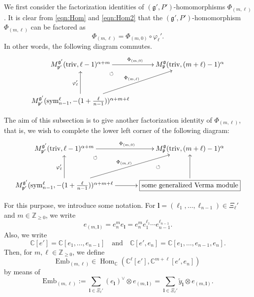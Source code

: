\documentclass[reqno,11pt]{amsart}
\theoremstyle{remark}
\theoremstyle{definition}
\numberwithin{equation}{section}
\newcommand{\ga}{\alpha}
\newcommand{\fg}{{\mathfrak g}}
\newcommand{\fp}{{\mathfrak p}}
\newcommand{\C}{\mathbb{C}}
\newcommand{\Z}{\mathbb{Z}}
\newcommand{\Hom}{\operatorname{Hom}}
\newcommand{\triv}{\mathrm{triv}}
\newcommand{\sym}{\mathrm{sym}}
\newcommand{\Mp}{M^{\fg}_{\fp}}
\newcommand{\Mpp}{M^{\fg'}_{\fp'}}
\newcommand{\Emb}{\mathrm{Emb}}
\newcommand{\wy}{\widetilde{y}}
\begin{document}
We first consider the factorization identities of 
$(\fg',P')$-homomorphisms $\Phi_{(m,\ell)}$.
It is clear from \eqref{eqn:Hom} and \eqref{eqn:Hom2} that
the $(\fg',P')$-homomorphism $\Phi_{(m,\ell)}$ can be factored as
\begin{equation*}
\Phi_{(m,\ell)} = \Phi_{(m,0)}\circ \varphi_\ell'.
\end{equation*}
In other words, the following diagram commutes.
\begin{equation*}
 \xymatrix@=13pt{
 \Mpp(\triv,\ell-1)^{\ga+m} 
 \ar@{}[rd]|{\circlearrowleft}
 \ar[rr]^{\Phi_{(m,0)}}
 && \Mp(\triv,(m+\ell)-1)^\ga\\
 &&\\
 \Mpp(\sym^\ell_{n-1},-(1+\tfrac{\ell}{n-1}))^{\ga+m+\ell}
\ar[uu]^{\varphi_{\ell}'}
 \ar[rruu]^{\Phi_{(m,\ell)}} 
}
\end{equation*}

The aim of this subsection is to give another factorization identity of 
$\Phi_{(m,\ell)}$, that is, we wish to complete the lower left corner
of the following diagram:
\begin{equation*}
 \xymatrix@=13pt{
 \Mpp(\triv,\ell-1)^{\ga+m} 
 \ar@{}[rd]|{\circlearrowleft}
 \ar[rr]^{\Phi_{(m,0)}}
 && \Mp(\triv,(m+\ell)-1)^\ga\\
 &&\\
 \Mpp(\sym^\ell_{n-1},-(1+\tfrac{\ell}{n-1}))^{\ga+m+\ell}
\ar[uu]^{\varphi_{\ell}'}
 \ar[rr] \ar[rruu]^{\Phi_{(m,\ell)}} 
&&\fbox{some generalized Verma module}
\ar[uu]
\ar@{}[luu]|{\circlearrowleft}
}
\end{equation*}

For this purpose, we introduce some notation.
For $\mathbf{l} = (\ell_1, \ldots, \ell_{n-1}) \in \Xi_{\ell}'$
and $m \in \Z_{\geq 0}$, we write
\begin{equation*}
e_{(m,\mathbf{l})} 
=e_n^me_{\mathbf{l}}
=  e_n^m e_1^{\ell_1}\cdots e_{n-1}^{\ell_{n-1}}.
\end{equation*}
Also, we write
\begin{equation*}
\C[e'] = \C[e_1, \ldots, e_{n-1}]
\quad
\text{and}
\quad
\C[e',e_n] = \C[e_1,\ldots, e_{n-1}, e_n].
\end{equation*}
Then, for $m,\ell \in \Z_{\geq 0}$, we define
\begin{equation*}
\Emb_{(m,\ell)} \in \Hom_{\C}(\C^\ell[e'], \C^{m+\ell}[e',e_n])
\end{equation*}
by means of
\begin{equation}\label{eqn:Emb}
\Emb_{(m,\ell)} 
:= \sum_{\mathbf{l}\in\Xi_{\ell}'}
(e_{\mathbf{l}})^\vee \otimes e_{(m,\mathbf{l})}
= \sum_{\mathbf{l}\in\Xi_{\ell}'}
\wy_{\mathbf{l}} \otimes e_{(m,\mathbf{l})}.
\end{equation}
\end{document}
